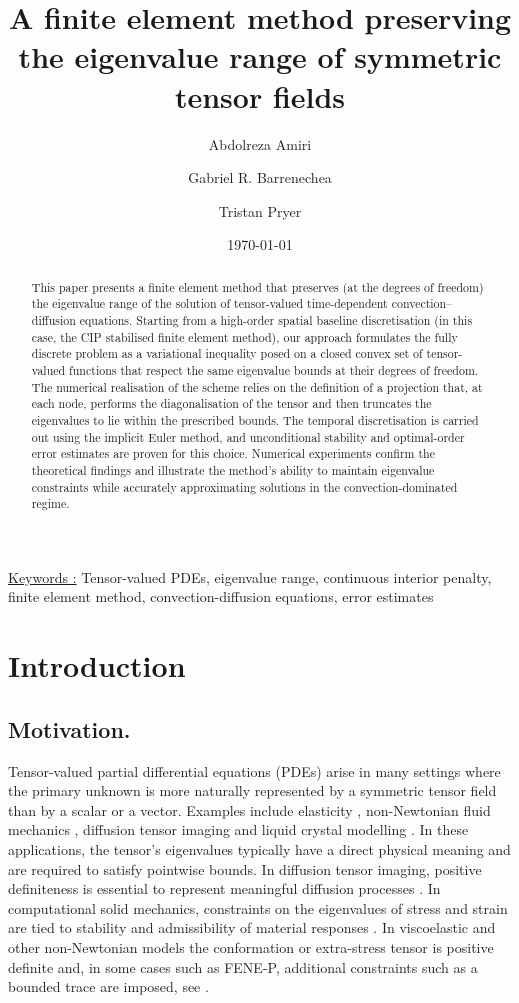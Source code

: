 \documentclass[final,12pt]{amsart}
\author{
  Abdolreza Amiri
  }
\author{
  Gabriel R.  Barrenechea
  }
\author{
  Tristan Pryer
}
\title[Preserving the eigenvalue range]{A finite element method preserving the eigenvalue range
	of symmetric tensor fields}
\date{\today}
\theoremstyle{plain}
\theoremstyle{definition}
\begin{document}
\maketitle

\begin{abstract}
  This paper presents a finite element method that
    preserves (at the degrees of freedom) the eigenvalue range of the solution of tensor-valued
  time-dependent convection--diffusion equations.  Starting from a high-order spatial
  baseline discretisation (in this case, the CIP stabilised finite
  element method), our approach formulates the fully
    discrete problem as a variational inequality posed on a closed
  convex set of tensor-valued functions that respect the same
  eigenvalue bounds at their degrees of freedom. The
  numerical realisation of the scheme relies on the
  definition of a projection that, at each node, performs the
  diagonalisation of the tensor and then truncates the eigenvalues
 to lie within the prescribed bounds. The temporal
  discretisation is carried out using the implicit Euler method, and
  unconditional stability and optimal-order error
  estimates are proven for this choice. Numerical experiments confirm
  the theoretical findings and illustrate the method's ability to
  maintain eigenvalue constraints while accurately approximating
  solutions in the convection-dominated regime.
\end{abstract}


	
\noindent\underline{Keywords :} Tensor-valued PDEs, eigenvalue range, continuous interior penalty, finite element method,  convection-diffusion equations,  error estimates 



\section{Introduction}
\label{sec:intro}

\subsection*{Motivation.}
Tensor-valued partial differential equations (PDEs) arise in many
settings where the primary unknown is more naturally represented by a
symmetric tensor field than by a scalar or a vector.  Examples include
elasticity \cite{Hughes2012}, non-Newtonian fluid mechanics
\cite{Owens2002}, diffusion tensor imaging \cite{Basser1994} and
liquid crystal modelling \cite{DeGennes1993}.  In these applications,
the tensor's eigenvalues typically have a direct physical meaning and
are required to satisfy pointwise bounds. In diffusion tensor imaging,
positive definiteness is essential to represent meaningful diffusion
processes \cite{Arsigny2006}. In computational solid mechanics,
constraints on the eigenvalues of stress and strain are tied to
stability and admissibility of material responses \cite{Simo1992}. In
viscoelastic and other non-Newtonian models the conformation or
extra-stress tensor is positive definite
\cite{ashby2025discretisation} and, in some cases such as FENE-P,
additional constraints such as a bounded trace are imposed, see
\cite{Owens2002}.
\end{document}
